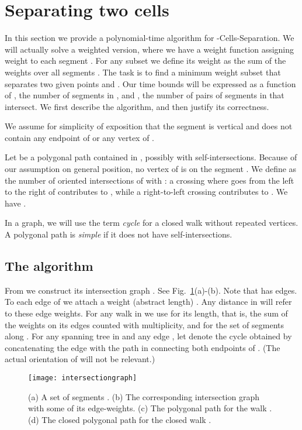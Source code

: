 \documentclass[11pt,a4paper]{article}
\begin{document}
\section{Separating two cells}

In this section we provide a polynomial-time algorithm for {\sc -Cells-Separation}.
We will actually solve a weighted version, where we have a weight function  assigning 
weight  to each segment . For any subset  we define its weight
 as the sum of the weights over all segments . 
The task is to find a minimum weight subset  that separates two given points  and .
Our time bounds will be expressed as a function of , the number of segments in ,
and , the number of pairs of segments in  that intersect.
We first describe the algorithm, and then justify its correctness.

We assume for simplicity of exposition that the segment  is vertical
and does not contain any endpoint of  or any vertex of .

Let  be a polygonal path contained in , possibly with self-intersections.
Because of our assumption on general position, no vertex
of  is on the segment .
We define  as the number of oriented intersections
of  with : a crossing where  goes from the left to the right of 
contributes  to ,
while a right-to-left crossing contributes  to .
We have .

In a graph, we will use the term \emph{cycle} for a closed walk without repeated vertices.
A polygonal path is \emph{simple} if it does not have self-intersections.

\subsection{The algorithm}
\label{sec:algorithm}

From  we construct its intersection graph 
.
See Fig.~\ref{fig:intersectiongraph}(a)-(b). 
Note that  has  edges.
To each edge  of  we attach a weight (abstract length) .
Any distance in  will refer to these edge weights.
For any walk  in  we use  for its length, that is, the sum of the weights on its edges
counted with multiplicity, and  for the set of segments along .
For any spanning tree  in  and any edge ,
let  denote the cycle obtained by concatenating the edge  with 
the path in  connecting both endpoints of . 
(The actual orientation of  will not be relevant.)

\begin{figure}
\centering
	\texttt{[image: intersectiongraph]}
	\caption{(a) A set of segments . 
			(b) The corresponding intersection graph  with some of its edge-weights.
			(c) The polygonal path  for the walk .
			(d) The closed polygonal path  for the closed walk .}
	\label{fig:intersectiongraph}
\end{figure}	
\end{document}
